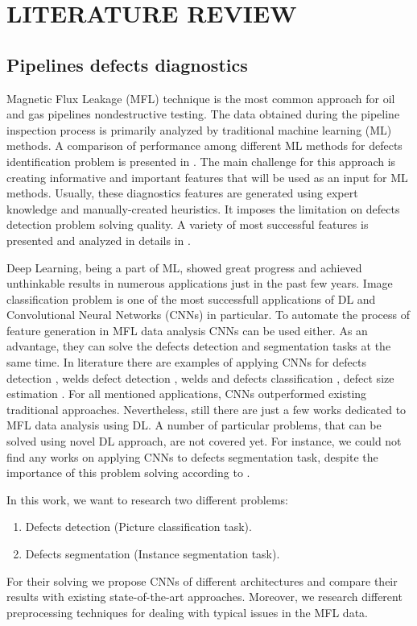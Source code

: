 \section{LITERATURE REVIEW}
\label{LITERATURE REVIEW}

\subsection{Pipelines defects diagnostics}

Magnetic Flux Leakage (MFL) technique is the most common approach for oil and gas pipelines nondestructive testing.
The data obtained during the pipeline inspection process is primarily analyzed by traditional machine learning (ML) methods.
A comparison of performance among different ML methods for defects identification problem is presented in \cite{Khodayari-Rostamabad2009}.
The main challenge for this approach is creating informative and important features that will be used as an input for ML methods.
Usually, these diagnostics features are generated using expert knowledge and manually-created heuristics.
It imposes the limitation on defects detection problem solving quality.
A variety of most successful features is presented and analyzed in details in \cite{Slesarev2017}.

Deep Learning, being a part of ML, showed great progress and achieved unthinkable results in numerous applications just in the past few years.
Image classification problem is one of the most successfull applications of DL and Convolutional Neural Networks (CNNs) in particular.
To automate the process of feature generation in MFL data analysis CNNs can be used either.
As an advantage, they can solve the defects detection and segmentation tasks at the same time.
In literature there are examples of applying CNNs for defects detection \cite{Feng2017}, welds defect detection \cite{2020a}, welds and defects classification \cite{Yang2020}, defect size estimation \cite{Lu2019}.
For all mentioned applications, CNNs outperformed existing traditional approaches.
Nevertheless, still there are just a few works dedicated to MFL data analysis using DL.
A number of particular problems, that can be solved using novel DL approach, are not covered yet.
For instance, we could not find any works on applying CNNs to defects segmentation task, despite the importance of this problem solving according to \cite{Feng2017}.

In this work, we want to research two different problems:
\begin{enumerate}
	\item Defects detection (Picture classification task).
	\item Defects segmentation (Instance segmentation task).
\end{enumerate}

For their solving we propose CNNs of different architectures and compare their results with existing state-of-the-art approaches.
Moreover, we research different preprocessing techniques for dealing with typical issues in the MFL data.